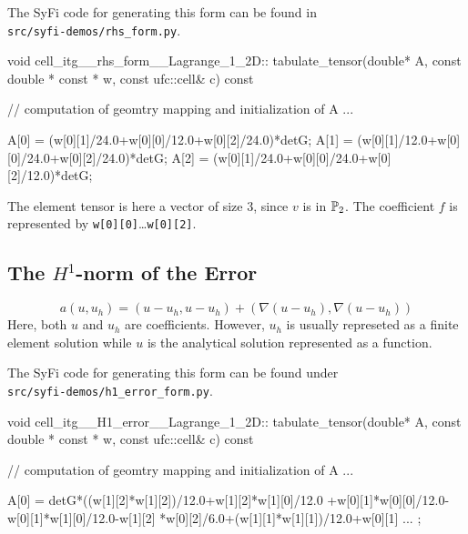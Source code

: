The SyFi code for generating this form can be found in \\
\texttt{src/syfi-demos/rhs\_form.py}.

\begin{code}
void cell_itg__rhs_form__Lagrange_1_2D::
     tabulate_tensor(double* A, const double * const * w,
                     const ufc::cell& c) const
{
  // computation of geomtry mapping and initialization of A ...
 
  A[0] = (w[0][1]/24.0+w[0][0]/12.0+w[0][2]/24.0)*detG;
  A[1] = (w[0][1]/12.0+w[0][0]/24.0+w[0][2]/24.0)*detG;
  A[2] = (w[0][1]/24.0+w[0][0]/24.0+w[0][2]/12.0)*detG;
}
\end{code}
The element tensor is here a vector of size 3, since $v$ is in $\P_2$. 
The coefficient $f$ is represented by \texttt{w[0][0]}\ldots\texttt{w[0][2]}. 


\subsection{The $H^1$-norm of the Error}
\begin{equation}
a(u,u_h) = (u-u_h, u-u_h) + (\nabla (u-u_h), \nabla(u-u_h))    
\end{equation}
Here, both $u$ and $u_h$ are coefficients. However, $u_h$ is usually
represeted as a finite element solution while $u$ is the analytical 
solution represented as a function. 


The SyFi code for generating this form can be found under \\ 
\texttt{src/syfi-demos/h1\_error\_form.py}.

\begin{code}
void cell_itg__H1_error__Lagrange_1_2D::
     tabulate_tensor(double* A, const double * const * w,
                     const ufc::cell& c) const
{

  // computation of geomtry mapping and initialization of A ...

  A[0] = detG*((w[1][2]*w[1][2])/12.0+w[1][2]*w[1][0]/12.0
       +w[0][1]*w[0][0]/12.0-w[0][1]*w[1][0]/12.0-w[1][2]
       *w[0][2]/6.0+(w[1][1]*w[1][1])/12.0+w[0][1]  ... ; 
}
\end{code}
